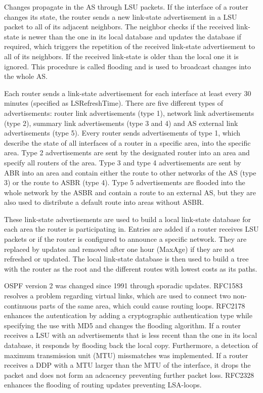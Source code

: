 \documentclass{acm_proc_article-sp}
\begin{document}
Changes propagate in the AS through LSU packets. If the interface of a router changes its state, the router sends a new link-state advertisement in a LSU packet to all of its adjacent neighbors. The neighbor checks if the received link-state is newer than the one in its local database and updates the database if required, which triggers the repetition of the received link-state advertisement to all of its neighbors. If the received link-state is older than the local one it is ignored. This procedure is called flooding and is used to broadcast changes into the whole AS.

Each router sends a link-state advertisement for each interface at least every 30 minutes (specified as LSRefreshTime). There are five different types of advertisements: router link advertisements (type 1), network link advertisements (type 2), summary link advertisements (type 3 and 4) and AS external link advertisements (type 5). Every router sends advertisements of type 1, which describe the state of all interfaces of a router in a specific area, into the specific area. Type 2 advertisements are sent by the designated router into an area and specify all routers of the area. Type 3 and type 4 advertisements are sent by ABR into an area and contain either the route to other networks of the AS (type 3) or the route to ASBR (type 4). Type 5 advertisements are flooded into the whole network by the ASBR and contain a route to an external AS, but they are also used to distribute a default route into areas without ASBR.

These link-state advertisements are used to build a local link-state database for each area the router is participating in. Entries are added if a router receives LSU packets or if the router is configured to announce a specific network. They are replaced by updates and removed after one hour (MaxAge) if they are not refreshed or updated. The local link-state database is then used to build a tree with the router as the root and the different routes with lowest costs as its paths.

OSPF version 2 was changed since 1991 through sporadic updates. RFC1583 \cite{RFC1583} resolves a problem regarding virtual links, which are used to connect two non-continuous parts of the same area, which could cause routing loops. RFC2178 \cite{RFC2178} enhances the autentication by adding a cryptographic authentication type while specifying the use with MD5 and changes the flooding algorithm. If a router receives a LSU with an advertisements that is less recent than the one in its local database, it responds by flooding back the local copy. Furthermore, a detection of maximum transmission unit (MTU) missmatches was implemented. If a router receives a DDP with a MTU larger than the MTU of the interface, it drops the packet and does not form an adcacency preventing further packet loss. RFC2328 enhances the flooding of routing updates preventing LSA-loops.
\end{document}
